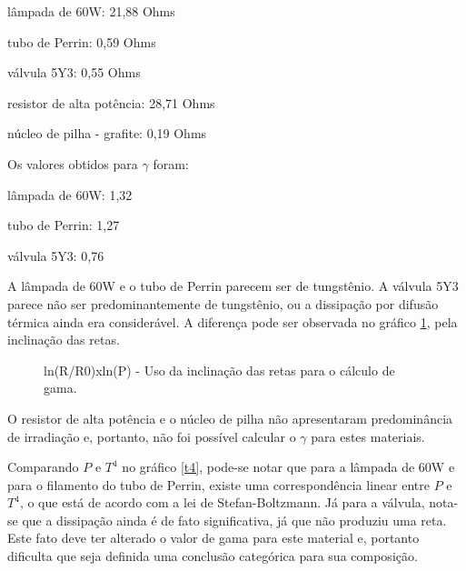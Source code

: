 \documentclass[brazilian,12pt,a4paper,final]{article}
\begin{document}
lâmpada de 60W: 21,88 Ohms

tubo de Perrin: 0,59 Ohms

válvula 5Y3: 0,55 Ohms

resistor de alta potência: 28,71 Ohms

núcleo de pilha - grafite: 0,19 Ohms

Os valores obtidos para $\gamma$ foram:

lâmpada de 60W: 1,32

tubo de Perrin: 1,27

válvula 5Y3: 0,76

A lâmpada de 60W e 
o tubo de Perrin parecem ser de tungstênio.
A válvula 5Y3 parece não ser predominantemente de tungstênio, ou a dissipação por
difusão térmica ainda era considerável.
A diferença pode ser observada no gráfico \ref{gamma}, pela inclinação das retas.

\begin{figure}[htbp!]
  \caption{ln(R/R0)xln(P) - Uso da inclinação das retas para o cálculo de gama.}
  \label{gamma}
  \centering
\end{figure}

O resistor de alta potência e o núcleo de pilha não apresentaram 
predominância de irradiação e, portanto, não foi possível calcular o $\gamma$ 
para estes materiais.

Comparando $P$ e $T^4$ no gráfico \ref{t4}, pode-se notar que para a lâmpada de 60W e para o filamento do tubo de Perrin, existe uma correspondência linear entre $P$ e $T^4$, o que está de acordo com a lei de Stefan-Boltzmann. Já para a válvula, nota-se que a dissipação ainda é de fato significativa, já que não produziu uma reta. Este fato deve ter alterado o valor de gama para este material e, portanto dificulta que seja definida uma conclusão categórica para sua composição.
\end{document}
